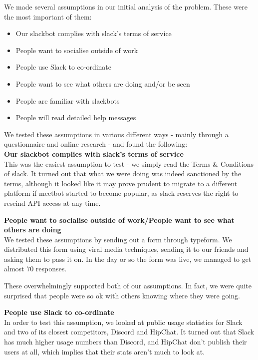 \documentclass[12pt]{report}
\begin{document}
We made several assumptions in our initial analysis of the problem. These were the most important of them:

\begin{itemize}
	\item Our slackbot complies with slack's terms of service
	\item People want to socialise outside of work
	\item People use Slack to co-ordinate
	\item People want to see what others are doing and/or be seen
	\item People are familiar with slackbots
	\item People will read detailed help messages
\end{itemize}

We tested these assumptions in various different ways - mainly through a questionnaire and online research - and found the following:\\

\textbf{Our slackbot complies with slack's terms of service}\\
This was the easiest assumption to test - we simply read the Terms \& Conditions of slack. It turned out that what we were doing was indeed sanctioned by the terms, although it looked like it may prove prudent to migrate to a different platform if meetbot started to become popular, as slack reserves the right to rescind API access at any time.

\textbf{People want to socialise outside of work/People want to see what others are doing}\\
We tested these assumptions by sending out a form through typeform. We distributed this form using viral media techniques, sending it to our friends and asking them to pass it on. In the day or so the form was live, we managed to get almost 70 responses.

These overwhelmingly supported both of our assumptions. In fact, we were quite surprised that people were so ok with others knowing where they were going.

\textbf{People use Slack to co-ordinate}\\
In order to test this assumption, we looked at public usage statistics for Slack and two of its closest competitors, Discord and HipChat. It turned out that Slack has much higher usage numbers than Discord, and HipChat don't publish their users at all, which implies that their stats aren't much to look at.
\end{document}
